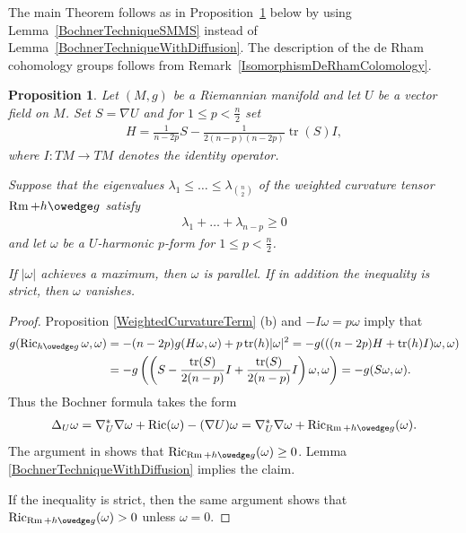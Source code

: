 \documentclass[10pt,a4paper]{amsart}
\numberwithin{equation}{section}
\newtheorem{Proposition}[Theorem]{Proposition}
{ \theoremstyle{definition}
\newtheorem{Remark}[Theorem]{Remark} }
\newcommand{\Ric} {\operatorname{Ric}}
\newcommand{ \tr } {\operatorname{tr}}
\newcommand{\Rm} {\operatorname{Rm}}
\begin{document}
The main Theorem follows as in Proposition~\ref{BochnerWithDiffusionForForms} below by using Lemma~\ref{BochnerTechniqueSMMS} instead of Lemma~\ref{BochnerTechniqueWithDiffusion}. The description of the de Rham cohomology groups follows from Remark~\ref{IsomorphismDeRhamColomology}.

\begin{Proposition}\label{BochnerWithDiffusionForForms}
Let $(M,g)$ be a Riemannian manifold and let $U$ be a vector field on $M$. Set $S= \nabla U$ and for $1 \leq p < \frac{n}{2}$ set
\begin{gather*}
H = \frac{1}{n-2p} S - \frac{1}{2(n-p)(n-2p)} \tr(S) I,
\end{gather*}
where $I \colon TM \to TM$ denotes the identity operator.

Suppose that the eigenvalues $\lambda_1 \leq \dots \leq \lambda_{\genfrac(){0pt}{2}{n}{2}}$ of the weighted curvature tensor $\Rm + h \owedge g$ satisfy
\begin{gather*}
\lambda_1 + \dots + \lambda_{n-p} \geq 0
\end{gather*}
and let $\omega$ be a $U$-harmonic $p$-form for $1 \leq p < \frac{n}{2}$.

If $| \omega |$ achieves a maximum, then $\omega$ is parallel. If in addition the inequality is strict, then $\omega$ vanishes.
\end{Proposition}
\begin{proof}
Proposition \ref{WeightedCurvatureTerm} (b) and $- I \omega = p \omega$ imply that
\begin{align*}
g( \Ric_{h \owedge g} \omega, \omega ) & = - (n-2p) g( H \omega, \omega) + p \tr(h) | \omega|^2
  = - g( ( (n-2p)H+ \tr(h) I ) \omega, \omega ) \\
& = - g \left( \left( S- \frac{\tr(S)}{2(n-p)} I + \frac{\tr(S)}{2(n-p)} I \right) \omega, \omega \right)
  = - g( S \omega, \omega ).
\end{align*}
Thus the Bochner formula takes the form
\begin{gather*}
\Delta_U \omega = \nabla^{*}_U \nabla \omega + \Ric(\omega) - (\nabla U) \omega = \nabla^{*}_U \nabla \omega + \Ric_{\Rm + h \owedge g}(\omega).
\end{gather*}
The argument in \cite[proof of Theorem A]{PetersenWinkBochner} shows that $\Ric_{\Rm+h \owedge g}( \omega ) \geq 0$. Lemma \ref{BochnerTechniqueWithDiffusion} implies the claim.

If the inequality is strict, then the same argument shows that $\Ric_{\Rm+h \owedge g}( \omega ) > 0$ unless $\omega =0$.
\end{proof}
\end{document}
